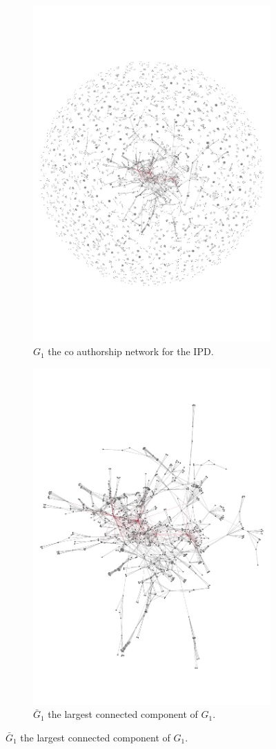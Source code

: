 \documentclass{article}
\theoremstyle{definition}
\begin{document}
\begin{figure}[!hbtp]
    \begin{subfigure}{.45\textwidth}\centering
        \includegraphics[width=.54\textwidth]{./assets/images/pd_network.pdf}
        \caption{\(G_1\) the co authorship network for the IPD.}\label{fig:g_one_network}
    \end{subfigure}\hfill
    \begin{subfigure}{.45\textwidth}\centering
        \includegraphics[width=.54\textwidth]{./assets/images/pd_network_cluster.pdf}
        \caption{\(\bar{G}_{1}\) the largest connected component of \(G_1\).}\label{fig:g_one_cluster}
     \end{subfigure}
     

\end{figure}
\end{document}
